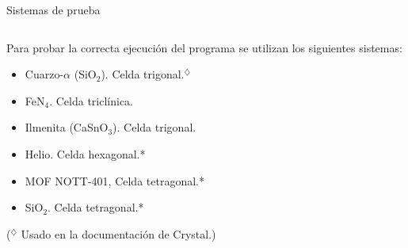 \documentclass[dvisvgm,11pt,aspectratio=169]{beamer}
\begin{document}
\begin{frame}{Sistemas de prueba}
\begin{columns}
\begin{column}{0.7\textwidth}
	Para probar la correcta ejecución del programa se utilizan los siguientes sistemas:
	\begin{itemize}
		\item Cuarzo-$\alpha$ (SiO$_2$). Celda trigonal.$^\diamondsuit$
		\item FeN$_4$. Celda triclínica.
		\item Ilmenita (CaSnO$_3$). Celda trigonal.
		\item Helio. Celda hexagonal.*
		\item MOF NOTT-401, Celda tetragonal.*
		\item SiO$_2$. Celda tetragonal.*
	\end{itemize}
	($^\diamondsuit$ Usado en la documentación de Crystal.)
	

\end{column}
\end{columns}
\end{frame}
\end{document}

